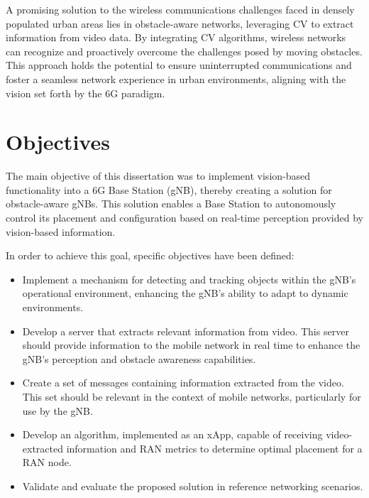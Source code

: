 A promising solution to the wireless communications challenges faced in densely populated urban areas lies in obstacle-aware networks, leveraging CV to extract information from video data. By integrating CV algorithms, wireless networks can recognize and proactively overcome the challenges posed by moving obstacles. This approach holds the potential to ensure uninterrupted communications and foster a seamless network experience in urban environments, aligning with the vision set forth by the 6G paradigm.

\section{Objectives}

The main objective of this dissertation was to implement vision-based functionality into a 6G Base Station (gNB), thereby creating a solution for obstacle-aware gNBs. This solution enables a Base Station to autonomously control its placement and configuration based on real-time perception provided by vision-based information.

In order to achieve this goal, specific objectives have been defined:

    \begin{itemize}
    
    \item Implement a mechanism for detecting and tracking objects within the gNB's operational environment, enhancing the gNB's ability to adapt to dynamic environments.
    
    \item Develop a server that extracts relevant information from video. This server should provide information to the mobile network in real time to enhance the gNB's perception and obstacle awareness capabilities.
    
    \item Create a set of messages containing information extracted from the video. This set should be relevant in the context of mobile networks, particularly for use by the gNB.
    
    \item Develop an algorithm, implemented as an xApp, capable of receiving video-extracted information and RAN metrics to determine optimal placement for a RAN node.
      
    \item Validate and evaluate the proposed solution in reference networking scenarios.
    
    \end{itemize}

